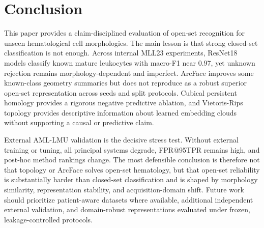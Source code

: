 \section{Conclusion}

This paper provides a claim-disciplined evaluation of open-set recognition for unseen hematological cell morphologies. The main lesson is that strong closed-set classification is not enough. Across internal MLL23 experiments, ResNet18 models classify known mature leukocytes with macro-F1 near 0.97, yet unknown rejection remains morphology-dependent and imperfect. ArcFace improves some known-class geometry summaries but does not reproduce as a robust superior open-set representation across seeds and split protocols. Cubical persistent homology provides a rigorous negative predictive ablation, and Vietoris-Rips topology provides descriptive information about learned embedding clouds without supporting a causal or predictive claim.

External AML-LMU validation is the decisive stress test. Without external training or tuning, all principal systems degrade, FPR@95TPR remains high, and post-hoc method rankings change. The most defensible conclusion is therefore not that topology or ArcFace solves open-set hematology, but that open-set reliability is substantially harder than closed-set classification and is shaped by morphology similarity, representation stability, and acquisition-domain shift. Future work should prioritize patient-aware datasets where available, additional independent external validation, and domain-robust representations evaluated under frozen, leakage-controlled protocols.
